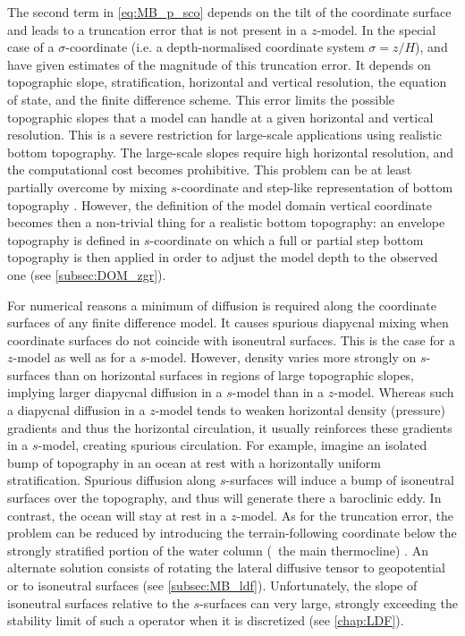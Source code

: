 \documentclass[../main/NEMO_manual]{subfiles}
\begin{document}
The second term in \autoref{eq:MB_p_sco} depends on the tilt of the coordinate surface and
leads to a truncation error that is not present in a $z$-model.
In the special case of a $\sigma$-coordinate
(i.e. a depth-normalised coordinate system $\sigma = z/H$),
\citet{haney_JPO91} and \citet{beckmann.haidvogel_JPO93} have given estimates of
the magnitude of this truncation error.
It depends on topographic slope, stratification, horizontal and vertical resolution,
the equation of state, and the finite difference scheme.
This error limits the possible topographic slopes that a model can handle at
a given horizontal and vertical resolution.
This is a severe restriction for large-scale applications using realistic bottom topography.
The large-scale slopes require high horizontal resolution,
and the computational cost becomes prohibitive.
This problem can be at least partially overcome by mixing $s$-coordinate and
step-like representation of bottom topography
\citep{gerdes_JGR93,gerdes_JGR93*a,madec.delecluse.ea_JPO96}.
However, the definition of the model domain vertical coordinate becomes then a non-trivial thing for
a realistic bottom topography:
an envelope topography is defined in $s$-coordinate on which
a full or partial step bottom topography is then applied in order to
adjust the model depth to the observed one (see \autoref{subsec:DOM_zgr}).

For numerical reasons a minimum of diffusion is required along
the coordinate surfaces of any finite difference model.
It causes spurious diapycnal mixing when coordinate surfaces do not coincide with isoneutral surfaces.
This is the case for a $z$-model as well as for a $s$-model.
However, density varies more strongly on $s$-surfaces than on horizontal surfaces in
regions of large topographic slopes,
implying larger diapycnal diffusion in a $s$-model than in a $z$-model.
Whereas such a diapycnal diffusion in a $z$-model tends to
weaken horizontal density (pressure) gradients and thus the horizontal circulation,
it usually reinforces these gradients in a $s$-model, creating spurious circulation.
For example, imagine an isolated bump of topography in
an ocean at rest with a horizontally uniform stratification.
Spurious diffusion along $s$-surfaces will induce a bump of isoneutral surfaces over the topography,
and thus will generate there a baroclinic eddy.
In contrast, the ocean will stay at rest in a $z$-model.
As for the truncation error, the problem can be reduced by
introducing the terrain-following coordinate below the strongly stratified portion of the water column
(\ie\ the main thermocline) \citep{madec.delecluse.ea_JPO96}.
An alternate solution consists of rotating the lateral diffusive tensor to
geopotential or to isoneutral surfaces (see \autoref{subsec:MB_ldf}).
Unfortunately, the slope of isoneutral surfaces relative to the $s$-surfaces can very large,
strongly exceeding the stability limit of such a operator when it is discretized
(see \autoref{chap:LDF}).
\end{document}
